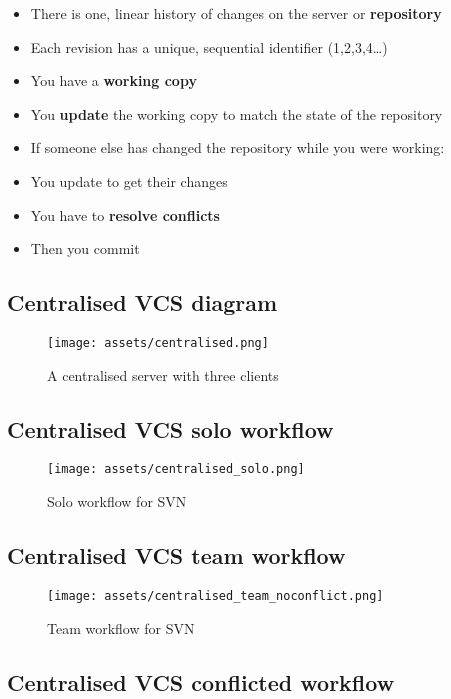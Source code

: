 \documentclass[]{scrartcl}
\makeatletter
\def\maxwidth{\ifdim\Gin@nat@width>\linewidth\linewidth
\else\Gin@nat@width\fi}
\let\Oldincludegraphics\includegraphics
\renewcommand{\includegraphics}[1]{\Oldincludegraphics[width=\maxwidth]{#1}}
\makeatother
\begin{document}
\begin{itemize}
\itemsep1pt\parskip0pt
\item
  There is one, linear history of changes on the server or
  \textbf{repository}
\item
  Each revision has a unique, sequential identifier (1,2,3,4\ldots{})
\item
  You have a \textbf{working copy}
\item
  You \textbf{update} the working copy to match the state of the
  repository
\item
  If someone else has changed the repository while you were working:
\item
  You update to get their changes
\item
  You have to \textbf{resolve conflicts}
\item
  Then you commit
\end{itemize}

\subsection{Centralised VCS diagram}\label{centralised-vcs-diagram}

\begin{figure}[htbp]
\centering
\texttt{[image: assets/centralised.png]}
\caption{A centralised server with three clients}
\end{figure}

\subsection{Centralised VCS solo
workflow}\label{centralised-vcs-solo-workflow}

\begin{figure}[htbp]
\centering
\texttt{[image: assets/centralised\_solo.png]}
\caption{Solo workflow for SVN}
\end{figure}

\subsection{Centralised VCS team
workflow}\label{centralised-vcs-team-workflow}

\begin{figure}[htbp]
\centering
\texttt{[image: assets/centralised\_team\_noconflict.png]}
\caption{Team workflow for SVN}
\end{figure}

\subsection{Centralised VCS conflicted
workflow}\label{centralised-vcs-conflicted-workflow}
\end{document}
